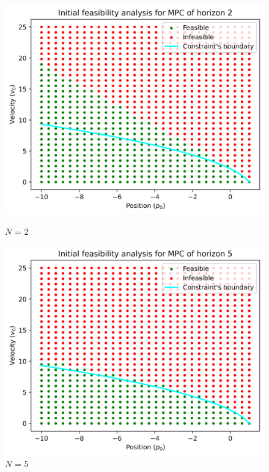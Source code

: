 \documentclass[]{article}
\begin{document}
\begin{figure}[H]
    \centering
    \begin{minipage}{0.5\textwidth}
        \centering
        \includegraphics[width=\textwidth]{images/Assignment_24_N2.png}
        \caption{$N$ = 2}
        \label{fig:assignment2_4_1}
    \end{minipage}
    \hfill
    \begin{minipage}{0.5\textwidth}
        \centering
        \includegraphics[width=\textwidth]{images/Assignment_24_N5.png}
        \caption{$N$ = 5}
        \label{fig:assignment2_4_2}
    \end{minipage}
\end{figure}
\end{document}
